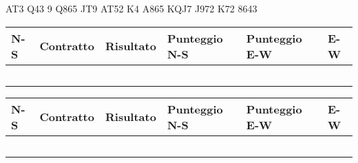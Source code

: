 \documentclass[a4paper,italian,12pt]{article}
\begin{document}
\medskip

\begin{tcolorbox}
\begin{minipage}{.3\textwidth}
\newgame
{}
     {AT3} {Q43} {9}
     {Q865} {JT9} {AT52}
     {K4} {A865} {KQJ7}
     {J972} {K72} {8643}
 
\hspace{-.2cm}\showAll
\end{minipage}
\begin{minipage}{.7\textwidth}

\renewcommand{\arraystretch}{2}
\begin{tabular}{|l|l|l|l|l|l|}
\hline
N-S & Contratto\hspace{1.5cm} & Risultato& Punteggio N-S & Punteggio E-W & E-W\\\hline
  &&&&&\\\hline
   &&&&&\\\hline
    &&&&&\\\hline
     &&&&&\\\hline
          &&&&&\\\hline
\end{tabular}
\end{minipage}
\end{tcolorbox}

\medskip

\begin{tcolorbox}
\begin{minipage}{.3\textwidth}
\newgame
{}

\hspace{-.2cm}\showAll
\end{minipage}
\begin{minipage}{.7\textwidth}

\renewcommand{\arraystretch}{2}
\begin{tabular}{|l|l|l|l|l|l|}
\hline
N-S & Contratto\hspace{1.5cm} & Risultato& Punteggio N-S & Punteggio E-W & E-W\\\hline
  &&&&&\\\hline
   &&&&&\\\hline
    &&&&&\\\hline
     &&&&&\\\hline
          &&&&&\\\hline
\end{tabular}
\end{minipage}
\end{tcolorbox}
\newpage
\end{document}
